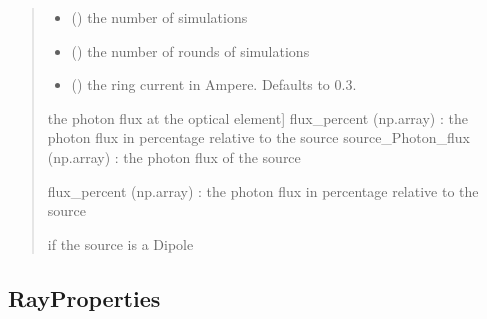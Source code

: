\documentclass[letterpaper,10pt,english]{sphinxmanual}
\begin{document}
\begin{fulllineitems}
\begin{fulllineitems}
\begin{quote}
\begin{description}
\begin{itemize}
\item {} 
\sphinxAtStartPar
{} () \textendash{} the number of simulations

\item {} 
\sphinxAtStartPar
{} () \textendash{} the number of rounds of simulations

\item {} 
\sphinxAtStartPar
{} (\sphinxstyleliteralemphasis{\sphinxupquote{, }}) \textendash{} the ring current in Ampere. Defaults to 0.3.

\end{itemize}

\sphinxAtStartPar
\begin{description}
\sphinxlineitem{photon\_flux (np.array)}{[}the photon flux at the optical element{]}
\sphinxAtStartPar
flux\_percent (np.array) : the photon flux in percentage relative to the source
source\_Photon\_flux (np.array) : the photon flux of the source

\sphinxAtStartPar
flux\_percent (np.array) : the photon flux in percentage relative to the source

\end{description}


\sphinxAtStartPar
if the source is a Dipole

\end{description}\end{quote}

\end{fulllineitems}


\end{fulllineitems}



\subsection{RayProperties}
\label{\detokenize{API:rayproperties}}
\end{document}
